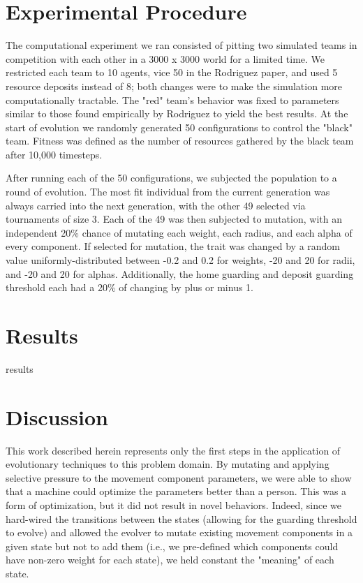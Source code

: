 \documentclass[12pt,journal,compsoc]{IEEEtran}
\begin{document}
\section{Experimental Procedure}

The computational experiment we ran consisted of pitting two simulated teams in competition with each other in a 3000 x 3000 world for a limited time. We restricted each team to 10 agents, vice 50 in the Rodriguez paper, and used 5 resource deposits instead of 8; both changes were to make the simulation more computationally tractable. The "red" team's behavior was fixed to parameters similar to those found empirically by Rodriguez to yield the best results. At the start of evolution we randomly generated 50 configurations to control the "black" team. Fitness was defined as the number of resources gathered by the black team after 10,000 timesteps.

After running each of the 50 configurations, we subjected the population to a round of evolution. The most fit individual from the current generation was always carried into the next generation, with the other 49 selected via tournaments of size 3. Each of the 49 was then subjected to mutation, with an independent 20\% chance of mutating each weight, each radius, and each alpha of every component. If selected for mutation, the trait was changed by a random value uniformly-distributed between -0.2 and 0.2 for weights, -20 and 20 for radii, and -20 and 20 for alphas. Additionally, the home guarding and deposit guarding threshold each had a 20\% of changing by plus or minus 1.

\section{Results}
results

\section{Discussion}
This work described herein represents only the first steps in the application of evolutionary techniques to this problem domain. By mutating and applying selective pressure to the movement component parameters, we were able to show that a machine could optimize the parameters better than a person. This was a form of optimization, but it did not result in novel behaviors. Indeed, since we hard-wired the transitions between the states (allowing for the guarding threshold to evolve) and allowed the evolver to mutate existing movement components in a given state but not to add them (i.e., we pre-defined which components could have non-zero weight for each state), we held constant the "meaning" of each state.
\end{document}
